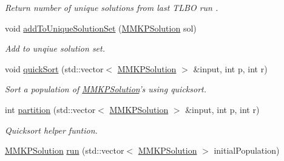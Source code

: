 \begin{DoxyCompactItemize}
\begin{DoxyCompactList}\small\item\em Return number of unique solutions from last T\+L\+B\+O run . \end{DoxyCompactList}\item 
void \hyperlink{class_m_m_k_p___t_l_b_o_aec2c0d19229e361d745740bacf10b679}{add\+To\+Unique\+Solution\+Set} (\hyperlink{class_m_m_k_p_solution}{M\+M\+K\+P\+Solution} sol)
\begin{DoxyCompactList}\small\item\em Add to unqiue solution set. \end{DoxyCompactList}\item 
void \hyperlink{class_m_m_k_p___t_l_b_o_a40f0e094b6dff74ff91d0e0d7c4a27e9}{quick\+Sort} (std\+::vector$<$ \hyperlink{class_m_m_k_p_solution}{M\+M\+K\+P\+Solution} $>$ \&input, int p, int r)
\begin{DoxyCompactList}\small\item\em Sort a population of \hyperlink{class_m_m_k_p_solution}{M\+M\+K\+P\+Solution}'s using quicksort. \end{DoxyCompactList}\item 
\hypertarget{class_m_m_k_p___t_l_b_o_a53c91633b431434f6179202486642214}{int \hyperlink{class_m_m_k_p___t_l_b_o_a53c91633b431434f6179202486642214}{partition} (std\+::vector$<$ \hyperlink{class_m_m_k_p_solution}{M\+M\+K\+P\+Solution} $>$ \&input, int p, int r)}\label{class_m_m_k_p___t_l_b_o_a53c91633b431434f6179202486642214}

\begin{DoxyCompactList}\small\item\em Quicksort helper funtion. \end{DoxyCompactList}\item 
\hypertarget{class_m_m_k_p___t_l_b_o_accea97f95a12f373c6a0907804de0db8}{\hyperlink{class_m_m_k_p_solution}{M\+M\+K\+P\+Solution} \hyperlink{class_m_m_k_p___t_l_b_o_accea97f95a12f373c6a0907804de0db8}{run} (std\+::vector$<$ \hyperlink{class_m_m_k_p_solution}{M\+M\+K\+P\+Solution} $>$ initial\+Population)}\label{class_m_m_k_p___t_l_b_o_accea97f95a12f373c6a0907804de0db8}


\end{DoxyCompactItemize}
